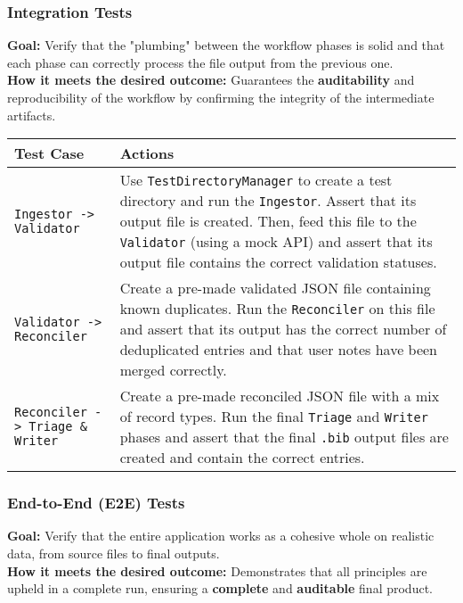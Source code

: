\documentclass[11pt, a4paper]{article}
\begin{document}
\subsubsection{Integration Tests}
\textbf{Goal:} Verify that the "plumbing" between the workflow phases is solid and that each phase can correctly process the file output from the previous one. \\
\textbf{How it meets the desired outcome:} Guarantees the \textbf{auditability} and reproducibility of the workflow by confirming the integrity of the intermediate artifacts.

\begin{table}[h!]
\centering
\begin{tabular}{lp{}}
\toprule
\textbf{Test Case} & \textbf{Actions} \\
\midrule
\texttt{Ingestor -> Validator} &
Use \texttt{TestDirectoryManager} to create a test directory and run the \texttt{Ingestor}. Assert that its output file is created. Then, feed this file to the \texttt{Validator} (using a mock API) and assert that its output file contains the correct validation statuses. \\
\addlinespace
\texttt{Validator -> Reconciler} &
Create a pre-made validated JSON file containing known duplicates. Run the \texttt{Reconciler} on this file and assert that its output has the correct number of deduplicated entries and that user notes have been merged correctly. \\
\addlinespace
\texttt{Reconciler -> Triage \& Writer} &
Create a pre-made reconciled JSON file with a mix of record types. Run the final \texttt{Triage} and \texttt{Writer} phases and assert that the final \texttt{.bib} output files are created and contain the correct entries. \\
\bottomrule
\end{tabular}
\end{table}

\subsubsection{End-to-End (E2E) Tests}
\textbf{Goal:} Verify that the entire application works as a cohesive whole on realistic data, from source files to final outputs. \\
\textbf{How it meets the desired outcome:} Demonstrates that all principles are upheld in a complete run, ensuring a \textbf{complete} and \textbf{auditable} final product.
\end{document}

